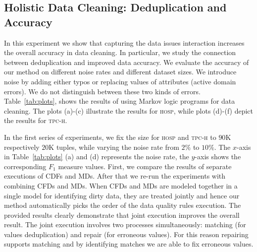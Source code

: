 \subsection{Holistic Data Cleaning: Deduplication and Accuracy}
\label{subsec:exp1}
In this experiment we show that capturing the data issues interaction increases the overall accuracy in data cleaning. In particular, we study the connection between deduplication and improved data accuracy. We evaluate the accuracy of our method on different noise rates and different dataset sizes. We introduce noise by adding either typos or replacing values of attributes (active domain errors). We do not distinguish between these two kinds of errors. Table~\ref{tab:plots}, shows the results of using Markov logic programs for data cleaning. The plots (a)-(c) illustrate the results for \textsc{hosp}, while plots (d)-(f) depict the results for \textsc{tpc-h}. %

In the first series of experiments, we fix the size for \textsc{hosp} and \textsc{tpc-h} to $90$K respectively $20$K tuples, while varying the noise rate from $2\%$ to $10\%$. The $x$-axis in Table~\ref{tab:plots} (a) and (d) represents the noise rate, the $y$-axis shows the corresponding $F_1$ measure values. First, we compare the results of separate executions of CDFs and MDs. After that we re-run the experiments with combining CFDs and MDs. When CFDs and MDs are modeled together in a single model for identifying dirty data, they are treated jointly and hence our method automatically picks the order of the data quality rules execution. The provided results clearly demonstrate that joint execution improves the overall result. The joint execution involves two processes simultaneously: matching (for values deduplication) and repair (for erroneous values). For this reason repairing supports matching and by identifying matches we are able to fix erroneous values. %

